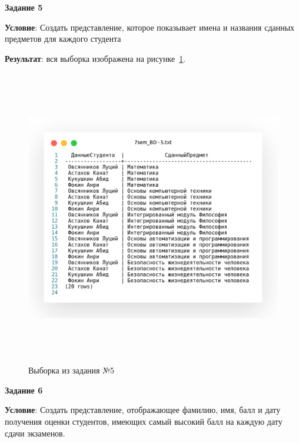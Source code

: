 \newpage

\begin{center}
  \textbf{Задание 5}
\end{center}

\textbf{Условие}:
Создать представление, которое показывает имена
и названия сданных предметов для каждого студента



\textbf{Результат}: вся выборка изображена на рисунке~\ref{fig:t5}.

\begin{figure}[!h]
  \centering

  \includegraphics[height=13cm]
  {../sql/task5/5.png}

  \caption{Выборка из задания №5}

  \label{fig:t5}
\end{figure}

\newpage

\begin{center}
  \textbf{Задание 6}
\end{center}

\textbf{Условие}:
Создать представление, отображающее фамилию, имя, балл и дату получения оценки студентов,
имеющих самый высокий балл на каждую дату сдачи экзаменов.



